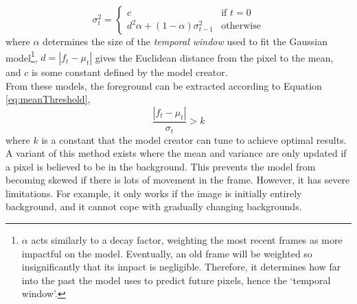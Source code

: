 \begin{equation}
    \label{eq:variance}
    \sigma^2_t =
    \begin{cases}
        c & \text{if $t = 0$} \\
        d^2 \alpha + (1 - \alpha) \sigma^2_{t-1} & \text{otherwise}
    \end{cases}
\end{equation}
where $\alpha$ determines the size of the \textit{temporal window} used to fit the Gaussian model\footnote{$\alpha$ acts similarly to a decay factor, weighting the most recent frames as more impactful on the model. Eventually, an old frame will be weighted so insignificantly that its impact is negligible. Therefore, it determines how far into the past the model uses to predict future pixels, hence the `temporal window'.}, $d = |f_t - \mu_t|$ gives the Euclidean distance from the pixel to the mean, and $c$ is some constant defined by the model creator. 
\smallskip \\ \indent
From these models, the foreground can be extracted according to Equation \ref{eq:meanThreshold},
\begin{equation}
    \label{eq:meanThreshold}
    \frac{|f_t - \mu_t|}{\sigma_t} > k
\end{equation}
where $k$ is a constant that the model creator can tune to achieve optimal results.
\smallskip \\ \indent
A variant of this method exists where the mean and variance are only updated if a pixel is believed to be in the background. This prevents the model from becoming skewed if there is lots of movement in the frame. However, it has severe limitations. For example, it only works if the image is initially entirely background, and it cannot cope with gradually changing backgrounds.

\setlength{\leftskip}{0cm}

